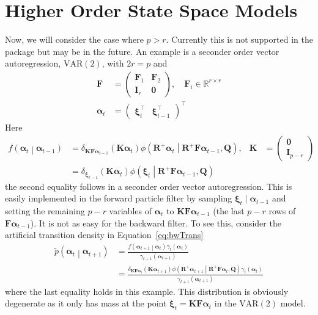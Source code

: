 \documentclass[notitlepage]{article}
\renewcommand{\vec}[1]{\bm{#1}}
\newcommand{\mat}[1]{\mathbf{#1}}
\newcommand{\Lparen}[1]{\left( #1\right)}
\newcommand{\Cond}[2]{ #1 \middle\vert  #2}
\newcommand{\optor}[2]{#1\Lparen{#2}}
\newcommand{\optorC}[3]{\optor{#1}{\Cond{#2}{#3}}}
\newcommand{\pdenstC}[2]{\optorC{\widetilde p}{#1}{#2}}
\newcommand{\normaldC}[3]{\optorC{\phi}{#1}{#2,#3}}
\newcommand\dirac[2]{\optor{\delta_{#1}}{#2}}
\newcommand{\dimState}{p}
\newcommand{\dimRng}{r}
\newcommand\MVAR[1]{\optor{\text{VAR}}{#1}}
\begin{document}
\section{Higher Order State Space Models}
Now, we will consider the case where $\dimState > \dimRng$. 
Currently this is not supported in the package but may be in the future. 
An example is a seconder 
order vector autoregression, $\MVAR{2}$, with $2\dimRng = \dimState$ and %
%
\begin{align*}
\mat F &= \begin{pmatrix}
		\mat F_1 & \mat F_2 \\
		\mat I_\dimRng & \mat 0
	\end{pmatrix}, \quad \mat F_i \in \mathbb{R}^{\dimRng\times\dimRng} \\
\vec\alpha_t &= \begin{pmatrix}
	\vec\xi_t^\top & \vec\xi_{t-1}^\top
\end{pmatrix}^\top
\end{align*}%
%
Here %
%
\begin{align*}
\optorC{f}{\vec\alpha_t}{\vec\alpha_{t - 1}} &= 
	\dirac{\mat K\mat F\vec\alpha_{t-1}}{\mat K\vec\alpha_t}
	\normaldC{\mat R^+\vec\alpha_t}{
		\mat R^+\mat F\vec\alpha_{t-1}}{\mat Q}, 
	& \mat K &=
		\begin{pmatrix} \mat 0 \\ \mat I_{\dimState - \dimRng} \end{pmatrix}  \\
&= \dirac{\vec \xi_{t-1}}{\mat K\vec\alpha_t}
	\normaldC{\vec\xi_t}{\mat R^+\mat F\vec\alpha_{t-1}}{\mat Q}
\end{align*}%
%
the second equality follows in a seconder order vector autoregression. 
This is easily implemented in the forward 
particle filter by sampling $\vec\xi_t \mid \vec\alpha_{t-1}$ and setting the remaining
$\dimState - \dimRng$ variables of $\vec\alpha_t$ to 
$\mat K\mat F\vec\alpha_{t-1}$ (the last $\dimState - \dimRng$ rows of 
$\mat F\vec\alpha_{t-1}$). It is not as easy for the backward filter. To see this, consider the artificial transition density in Equation~\eqref{eq:bwTrans}%
%
\begin{align*}
\pdenstC{\vec{\alpha}_t}{\vec{\alpha}_{t+1}} &= 
	\frac{
		\optorC{f}{\vec\alpha_{t+1}}{\vec\alpha_t}
		\gamma_t(\vec\alpha_t)
	}{\gamma_{t+1}(\vec\alpha_{t + 1})} \\
& = \frac{
		\dirac{\mat K\mat F\vec\alpha_t}{\mat K\vec\alpha_{t + 1}}
		\normaldC{\mat R^+\vec\alpha_{t +1}}{
			\mat R^+\mat F\vec\alpha_t}{\mat Q}
		\gamma_t(\vec\alpha_t)
	}{\gamma_{t+1}(\vec\alpha_{t + 1})}
\end{align*}%
%
where the last equality holds in this example. This distribution is obviously degenerate 
as it only has mass at the point $\vec\xi_t = \mat K\mat F\vec\alpha_t$ in the 
$\text{VAR}(2)$ model. 
\end{document}
